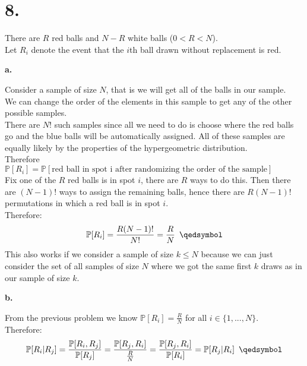 \documentclass{article}
\begin{document}
\newpage
\section*{8.}
\begin{center}
\doublespacing
    There are $R$ red balls and $N - R$ white balls ($0 < R < N$).
    \\Let $R_i$ denote the event that the $i$th ball drawn without replacement is red.
\end{center}

{\Large\textbf{a.}}
\begin{center}
\doublespacing
    Consider a sample of size $N$, that is we will get all of the balls in our sample.
    \\We can change the order of the elements in this sample to get any of the other possible samples.
    \\There are $N!$ such samples since all we need to do is choose where the red balls go and the blue balls will be automatically assigned. All of these samples are equally likely by the properties of the hypergeometric distribution.
    \\Therefore $\mathbb{P}[R_i] =\mathbb{P}[\mbox{red ball in spot i after randomizing the order of the sample}]$
    \\Fix one of the $R$ red balls is in spot $i$, there are $R$ ways to do this. Then there are $(N-1)!$ ways to assign the remaining balls, hence there are $R(N-1)!$ permutations in which a red ball is in spot $i$.
    \\Therefore:
    \[\mathbb{P}[R_i] =\frac{R(N-1)!}{N!} =\frac{R}{N}\;\:\qedsymbol\]
    This also works if we consider a sample of size $k\leq N$ because we can just consider the set of all samples of size $N$ where we got the same first $k$ draws as in our sample of size $k$.
\end{center}

{\Large\textbf{b.}}
\begin{center}
\doublespacing
    From the previous problem we know $\mathbb{P}[R_i] =\frac{R}{N}$ for all $i\in\{1, ..., N\}$.
    \\Therefore:
    \[\mathbb{P}[R_i | R_j] =\frac{\mathbb{P}[R_i, R_j]}{\mathbb{P}[R_j]} =\frac{\mathbb{P}[R_j, R_i]}{\frac{R}{N}} =\frac{\mathbb{P}[R_j, R_i]}{\mathbb{P}[R_i]} =\mathbb{P}[R_j | R_i]\;\:\qedsymbol\]
\end{center}
\end{document}
